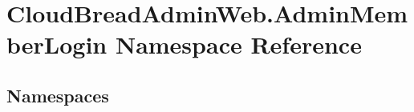 \hypertarget{namespace_cloud_bread_admin_web_1_1_admin_member_login}{}\section{Cloud\+Bread\+Admin\+Web.\+Admin\+Member\+Login Namespace Reference}
\label{namespace_cloud_bread_admin_web_1_1_admin_member_login}
\subsection*{Namespaces}
\begin{DoxyCompactItemize}
\end{DoxyCompactItemize}
